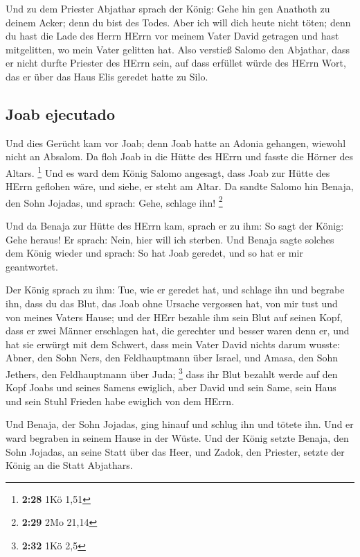  Und zu dem Priester Abjathar sprach der König: Gehe hin
gen Anathoth zu deinem Acker; denn du bist des Todes. Aber ich will dich
heute nicht töten; denn du hast die Lade des Herrn HErrn vor meinem
Vater David getragen und hast mitgelitten, wo mein Vater gelitten hat.
 Also verstieß Salomo den Abjathar, dass er nicht durfte
Priester des HErrn sein, auf dass erfüllet würde des HErrn Wort, das er
über das Haus Elis geredet hatte zu Silo.

\hypertarget{joab-ejecutado}{%
\subsection{Joab ejecutado}\label{joab-ejecutado}}

 Und dies Gerücht kam vor Joab; denn Joab hatte an Adonia
gehangen, wiewohl nicht an Absalom. Da floh Joab in die Hütte des HErrn
und fasste die Hörner des Altars. \footnote{\textbf{2:28} 1Kö 1,51}
 Und es ward dem König Salomo angesagt, dass Joab zur
Hütte des HErrn geflohen wäre, und siehe, er steht am Altar. Da sandte
Salomo hin Benaja, den Sohn Jojadas, und sprach: Gehe, schlage ihn!
\footnote{\textbf{2:29} 2Mo 21,14}

 Und da Benaja zur Hütte des HErrn kam, sprach er zu ihm:
So sagt der König: Gehe heraus! Er sprach: Nein, hier will ich sterben.
Und Benaja sagte solches dem König wieder und sprach: So hat Joab
geredet, und so hat er mir geantwortet.

 Der König sprach zu ihm: Tue, wie er geredet hat, und
schlage ihn und begrabe ihn, dass du das Blut, das Joab ohne Ursache
vergossen hat, von mir tust und von meines Vaters Hause; 
und der HErr bezahle ihm sein Blut auf seinen Kopf, dass er zwei Männer
erschlagen hat, die gerechter und besser waren denn er, und hat sie
erwürgt mit dem Schwert, dass mein Vater David nichts darum wusste:
Abner, den Sohn Ners, den Feldhauptmann über Israel, und Amasa, den Sohn
Jethers, den Feldhauptmann über Juda; \footnote{\textbf{2:32} 1Kö 2,5}
 dass ihr Blut bezahlt werde auf den Kopf Joabs und
seines Samens ewiglich, aber David und sein Same, sein Haus und sein
Stuhl Frieden habe ewiglich von dem HErrn.

 Und Benaja, der Sohn Jojadas, ging hinauf und schlug ihn
und tötete ihn. Und er ward begraben in seinem Hause in der Wüste.
 Und der König setzte Benaja, den Sohn Jojadas, an seine
Statt über das Heer, und Zadok, den Priester, setzte der König an die
Statt Abjathars.

